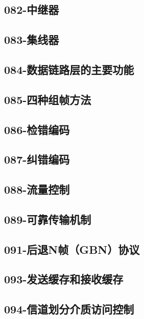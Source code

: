 \subsection{082-中继器}

\subsection{083-集线器}

\subsection{084-数据链路层的主要功能}

\subsection{085-四种组帧方法}

\subsection{086-检错编码}

\subsection{087-纠错编码}

\subsection{088-流量控制}

\subsection{089-可靠传输机制}

\subsection{091-后退N帧（GBN）协议}

\subsection{093-发送缓存和接收缓存}

\subsection{094-信道划分介质访问控制}

